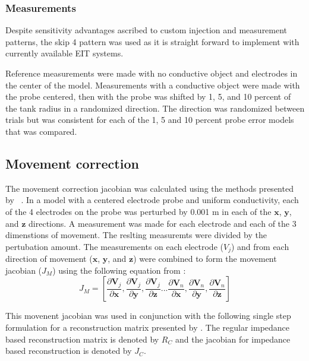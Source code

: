 \subsubsection{Measurements}
Despite sensitivity advantages ascribed to custom injection and 
measurement patterns, the skip 4 pattern was used as it 
is straight forward to implement with currently available EIT systems. 

Reference measurements were made with no conductive object and 
electrodes in the center of the model. Measurements with a conductive object were made 
with the probe centered, then
with the probe was shifted by 1, 5, and 10 percent of the tank radius in a randomized 
direction. The direction was randomized between trials but was consistent for 
each of the 1, 5 and 10 percent probe error models that was compared. 

\subsection{Movement correction}
\label{sec:3_methods}

The movement correction jacobian was calculated using the methods presented by
~. In a model with a centered electrode
probe and uniform conductivity, each of the 4 electrodes on the probe was
perturbed by 0.001 m in each of the $\mathbf x$, $\mathbf y$, 
and $\mathbf z$ directions. A measurement was made for 
each electrode and each of the 3 dimenstions of movement. 
The reslting measuremts were divided by the pertubation 
amount. 
The measurements on each electrode ($V_j$) and from each  direction 
of movement ($\mathbf x$, $\mathbf y$, 
and $\mathbf z$) were combined to form the movement 
jacobian ($J_M$) using the following equation from
:
\begin{equation}
	J_M = \left[ 
		  \frac{\partial\mathbf{V}_j}{\partial\mathbf{x}},
		  \frac{\partial\mathbf{V}_j}{\partial\mathbf{y}},
	      \frac{\partial\mathbf{V}_j}{\partial\mathbf{z}} ... 
		  \frac{\partial\mathbf{V}_n}{\partial\mathbf{x}},
		  \frac{\partial\mathbf{V}_n}{\partial\mathbf{y}},
	      \frac{\partial\mathbf{V}_n}{\partial\mathbf{z}} 
		  \right]
\end{equation}

This movenent jacobian was used in conjunction with the following single step 
formulation for a reconstruction matrix presented 
by . The regular impedance based 
reconstruction matrix is denoted by $R_C$ and the jacobian for impedance based 
reconstruction is denoted by $J_C$.

